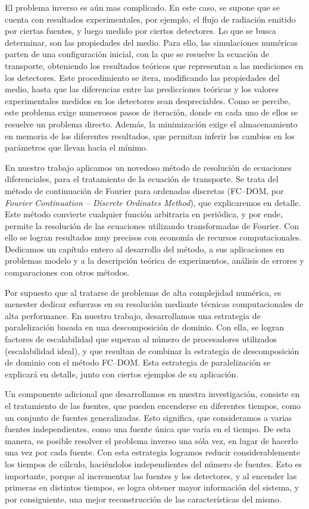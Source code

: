 El problema inverso es aún mas complicado. 
En este caso, se supone que se cuenta con resultados experimentales, 
por ejemplo, el flujo de radiación emitido por ciertas fuentes, 
y luego medido por ciertos detectores. 
Lo que se busca determinar, son las propiedades del medio.  
Para ello, las simulaciones numéricas parten de   
una configuración inicial, con la que se resuelve la ecuación de transporte, 
obteniendo los resultados teóricos que representan a las 
mediciones en los detectores. 
Este procedimiento se itera, modificando las propiedades del medio, hasta que las 
diferencias entre las predicciones teóricas y los valores experimentales 
medidos en los detectores sean despreciables.
Como se percibe, este problema exige numerosos pasos de iteración, 
donde en cada uno de ellos se resuelve un problema directo. 
Además, la minimización exige el almacenamiento en memoria de 
los diferentes resultados, que permitan inferir los cambios en 
los parámetros que llevan hacia el mínimo.

En nuestro trabajo aplicamos un novedoso método de resolución de 
ecuaciones diferenciales, para el tratamiento de la ecuación de 
transporte. Se trata del método de continuación de Fourier para 
ordenadas discretas (FC--DOM, por {\it Fourier Continuation -- Discrete 
Ordinates Method}), que explicaremos en detalle. 
Este método convierte cualquier función arbitraria en 
periódica, y por ende, permite la resolución de las ecuaciones 
utilizando transformadas de Fourier. Con ello se logran resultados 
muy precisos con economía de recursos computacionales.
Dedicamos un capítulo entero al desarrollo del método, a
sus aplicaciones en problemas modelo y a la descripción teórica de 
experimentos, análisis de errores y comparaciones con 
otros métodos.

Por supuesto que al tratarse de problemas de alta complejidad 
numérica, es menester dedicar esfuerzos en su resolución mediante 
técnicas computacionales de alta performance. 
En nuestro trabajo, desarrollamos una estrategia de paralelización 
basada en una descomposición de dominio. Con ella, se logran factores 
de escalabilidad que superan al 
número de procesadores utilizados (escalabilidad ideal), y que resultan de combinar 
la estrategia  de descomposición de dominio 
con el método FC--DOM.
Esta estrategia de paralelización se explicará en detalle, 
junto con ciertos ejemplos de su aplicación.

Un componente adicional que desarrollamos en nuestra investigación, 
consiste en el tratamiento de las fuentes, que pueden encenderse 
en diferentes tiempos, como un conjunto de fuentes generalizadas. 
Esto significa, que consideramos a varias fuentes independientes, 
como una fuente única que varía en el tiempo. 
De esta manera, es posible resolver el problema 
inverso una sóla vez, en lugar de hacerlo una vez por cada fuente. 
Con esta estrategia logramos reducir considerablemente los tiempos de 
cálculo, haciéndolos independientes del número de fuentes. 
Esto es importante, porque al incrementar las fuentes y los 
detectores, y al encender las primeras en distintos tiempos, 
se logra obtener mayor información del sistema, y por consiguiente, 
una mejor reconstrucción de las características del mismo.

